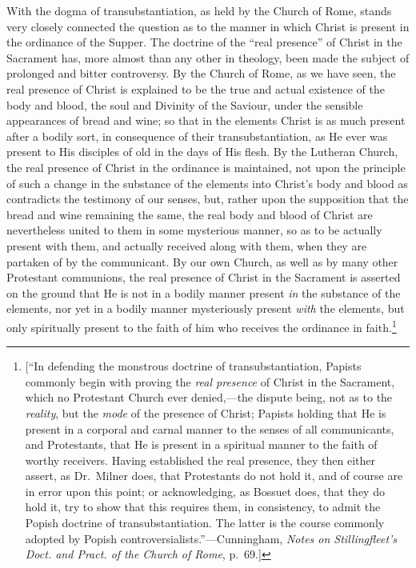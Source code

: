 \documentclass[
]{book}
\begin{document}
With the dogma of transubstantiation, as held by the Church of Rome, stands very closely connected the question as to the manner in which Christ is present in the ordinance of the Supper. The doctrine of the ``real presence'' of Christ in the Sacrament has, more almost than any other in theology, been made the subject of prolonged and bitter controversy. By the Church of Rome, as we have seen, the real presence of Christ is explained to be the true and actual existence of the body and blood, the soul and Divinity of the Saviour, under the sensible appearances of bread and wine; so that in the elements Christ is as much present after a bodily sort, in consequence of their transubstantiation, as He ever was present to His disciples of old in the days of His flesh. By the Lutheran Church, the real presence of Christ in the ordinance is maintained, not upon the principle of such a change in the substance of the elements into Christ's body and blood as contradicts the testimony of our senses, but, rather upon the supposition that the bread and wine remaining the same, the real body and blood of Christ are nevertheless united to them in some mysterious manner, so as to be actually present with them, and actually received along with them, when they are partaken of by the communicant. By our own Church, as well as by many other Protestant communions, the real presence of Christ in the Sacrament is asserted on the ground that He is not in a bodily manner present \emph{in} the substance of the elements, nor yet in a bodily manner mysteriously present \emph{with} the elements, but only spiritually present to the faith of him who receives the ordinance in faith.\footnote{{[}``In defending the monstrous doctrine of transubstantiation, Papists commonly begin with proving the \emph{real presence} of Christ in the Sacrament, which no Protestant Church ever denied,---the dispute being, not as to the \emph{reality}, but the \emph{mode} of the presence of Christ; Papists holding that He is present in a corporal and carnal manner to the senses of all communicants, and Protestants, that He is present in a spiritual manner to the faith of worthy receivers. Having established the real presence, they then either assert, as Dr.~Milner does, that Protestants do not hold it, and of course are in error upon this point; or acknowledging, as Bossuet does, that they do hold it, try to show that this requires them, in consistency, to admit the Popish doctrine of transubstantiation. The latter is the course commonly adopted by Popish controversialists.''---Cunningham, \emph{Notes on Stillingfleet's Doct. and Pract. of the Church of Rome}, p.~69.{]}}
\end{document}
